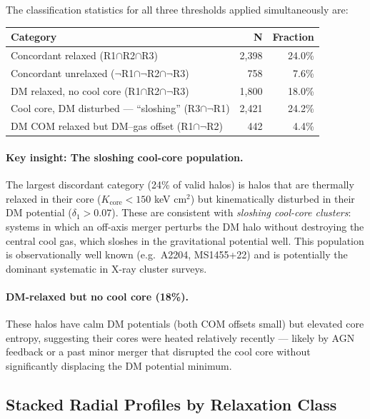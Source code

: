 \documentclass[12pt,a4paper]{article}
\begin{document}
\noindent The classification statistics for all three thresholds applied simultaneously are:
\begin{center}
\begin{tabular}{lrr}
\toprule
Category & N & Fraction \\
\midrule
Concordant relaxed (R1$\cap$R2$\cap$R3) & 2,398 & 24.0\% \\
Concordant unrelaxed ($\neg$R1$\cap\neg$R2$\cap\neg$R3) & 758 & 7.6\% \\
DM relaxed, no cool core (R1$\cap$R2$\cap\neg$R3) & 1,800 & 18.0\% \\
Cool core, DM disturbed --- ``sloshing'' (R3$\cap\neg$R1) & 2,421 & 24.2\% \\
DM COM relaxed but DM--gas offset (R1$\cap\neg$R2) & 442 & 4.4\% \\
\bottomrule
\end{tabular}
\end{center}

\paragraph{Key insight: The sloshing cool-core population.}
The largest discordant category (24\% of valid halos) is halos that are thermally
relaxed in their core ($K_\mathrm{core} < 150$ keV cm$^2$) but kinematically
disturbed in their DM potential ($\delta_1 > 0.07$). These are consistent with
\textit{sloshing cool-core clusters}: systems in which an off-axis merger perturbs
the DM halo without destroying the central cool gas, which sloshes in the
gravitational potential well. This population is observationally well known
(e.g.\ A2204, MS1455+22) and is potentially the dominant systematic
in X-ray cluster surveys.

\paragraph{DM-relaxed but no cool core (18\%).}
These halos have calm DM potentials (both COM offsets small) but elevated core
entropy, suggesting their cores were heated relatively recently --- likely by AGN
feedback or a past minor merger that disrupted the cool core without significantly
displacing the DM potential minimum.

\subsection{Stacked Radial Profiles by Relaxation Class}
\end{document}
